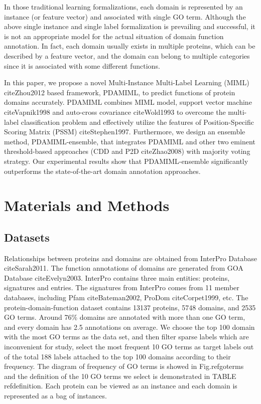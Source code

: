 \documentclass{bmcart}
\begin{document}
In those traditional learning formalizations, each domain is represented by an instance (or feature vector) and associated with single GO term. Although the above single instance and single label formalization is prevailing and successful, it is not an appropriate model for the actual situation of domain function annotation. In fact, each domain usually exists in multiple proteins, which can be described by a feature vector, and the domain can belong to multiple categories since it is associated with some different functions.

In this paper, we propose a novel Multi-Instance Multi-Label Learning (MIML) cite{Zhou2012} based framework, PDAMIML, to predict functions of protein domains accurately. PDAMIML combines MIML model, support vector machine cite{Vapnik1998} and auto-cross covariance cite{Wold1993} to overcome the multi-label classification problem and effectively utilize the features of Position-Specific Scoring Matrix (PSSM) cite{Stephen1997}. Furthermore, we design an ensemble method, PDAMIML-ensemble, that integrates PDAMIML and other two eminent threshold-based approaches (CDD and P2D cite{Zhao2008}) with majority voting strategy. Our experimental results show that PDAMIML-ensemble significantly outperforms the state-of-the-art domain annotation approaches.

\section*{Materials and Methods}
\subsection*{Datasets}
Relationships between proteins and domains are obtained from InterPro Database cite{Sarah2011}. The function annotations of domains are generated from GOA Database cite{Evelyn2003}. InterPro contains three main entities: proteins, signatures and entries. The signatures from InterPro comes from 11 member databases, including Pfam cite{Bateman2002}, ProDom cite{Corpet1999}, etc. The protein-domain-function dataset contains 13137 proteins, 5748 domains, and 2535 GO terms. Around 76\% domains are annotated with more than one GO term, and every domain has 2.5 annotations on average. We choose the top 100 domain with the most GO terms as the data set, and then filter sparse labels which are inconvenient for study, select the most frequent 10 GO terms as target labels out of the total 188 labels attached to the top 100 domains according to their frequency. The diagram of frequency of GO terms is showed in Fig.ref{goterms} and the definition of the 10 GO terms we select is demonstrated in TABLE  ref{definition}. Each protein can be viewed as an instance and each domain is represented as a bag of instances.
\end{document}
